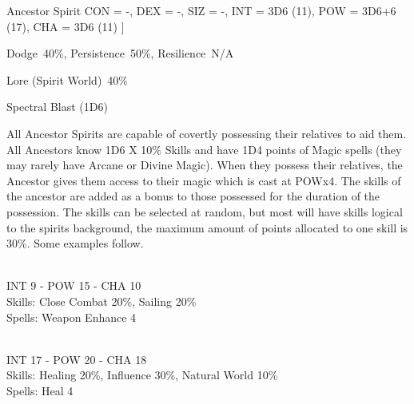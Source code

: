 \begin{samepage}
\begin{monsterbox}{Ancestor Spirit}
		CON = -,
		DEX = -,
		SIZ = -,
		INT = 3D6    (11),
		POW = 3D6+6  (17),
		CHA = 3D6    (11)
	]
	\rpghline%
	\begin{rpg-monsteraction}[Resistances]
		Dodge~40\%, Persistence~50\%, Resilience~N/A
	\end{rpg-monsteraction}
	\begin{rpg-monsteraction}[Knowledge]
		Lore (Spirit World)~40\%
	\end{rpg-monsteraction}
	\begin{rpg-monsteraction}
		Spectral Blast (1D6)
	\end{rpg-monsteraction}
	\begin{rpg-monsteraction}
		All Ancestor Spirits are capable of covertly possessing their relatives to aid them. All Ancestors know 1D6 X 10\% Skills and have 1D4 points of Magic spells (they may rarely have Arcane or Divine Magic). When they possess their relatives, the Ancestor gives them access to their magic which is cast at POWx4. The skills of the ancestor are added as a bonus to those possessed for the duration of the possession. The skills can be selected at random, but most will have skills logical to the spirits background, the maximum amount of points allocated to one skill is 30\%. Some examples follow.
	\end{rpg-monsteraction}
	\begin{rpg-monsteraction}
		\\INT 9 - POW 15 - CHA 10\\
		Skills: Close Combat 20\%, Sailing 20\%\\
                Spells: Weapon Enhance 4
	\end{rpg-monsteraction}

	\begin{rpg-monsteraction}
		\\INT 17 - POW 20 - CHA 18\\
		Skills: Healing 20\%, Influence 30\%, Natural World 10\%\\
                Spells: Heal 4
	\end{rpg-monsteraction}
\end{monsterbox}
\end{samepage}

